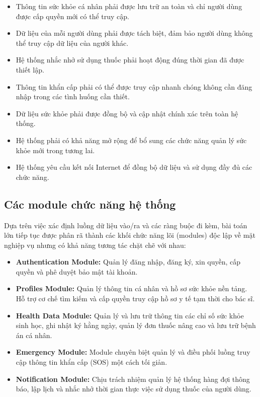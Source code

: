 \documentclass[12pt,a4paper]{report}
\begin{document}
\begin{itemize}[leftmargin=1.5em, itemsep=2pt]
    \item Thông tin sức khỏe cá nhân phải được lưu trữ an toàn và chỉ người dùng được cấp quyền mới có thể truy cập.
    \item Dữ liệu của mỗi người dùng phải được tách biệt, đảm bảo người dùng không thể truy cập dữ liệu của người khác.
    \item Hệ thống nhắc nhở sử dụng thuốc phải hoạt động đúng thời gian đã được thiết lập.
    \item Thông tin khẩn cấp phải có thể được truy cập nhanh chóng không cần đăng nhập trong các tình huống cần thiết.
    \item Dữ liệu sức khỏe phải được đồng bộ và cập nhật chính xác trên toàn hệ thống.
    \item Hệ thống phải có khả năng mở rộng để bổ sung các chức năng quản lý sức khỏe mới trong tương lai.
    \item Hệ thống yêu cầu kết nối Internet để đồng bộ dữ liệu và sử dụng đầy đủ các chức năng.
\end{itemize}

\subsection{Các module chức năng hệ thống}
Dựa trên việc xác định luồng dữ liệu vào/ra và các ràng buộc đi kèm, bài toán lớn tiếp tục được phân rã thành các khối chức năng lõi (modules) độc lập về mặt nghiệp vụ nhưng có khả năng tương tác chặt chẽ với nhau:

\begin{itemize}[leftmargin=1.5em, itemsep=3pt]
    \item \textbf{Authentication Module:} Quản lý đăng nhập, đăng ký, xin quyền, cấp quyền và phê duyệt bảo mật tài khoản.
    \item \textbf{Profiles Module:} Quản lý thông tin cá nhân và hồ sơ sức khỏe nền tảng. Hỗ trợ cơ chế tìm kiếm và cấp quyền truy cập hồ sơ y tế tạm thời cho bác sĩ.
    \item \textbf{Health Data Module:} Quản lý và lưu trữ thông tin các chỉ số sức khỏe sinh học, ghi nhật ký hằng ngày, quản lý đơn thuốc nâng cao và lưu trữ bệnh án cá nhân.
    \item \textbf{Emergency Module:} Module chuyên biệt quản lý và điều phối luồng truy cập thông tin khẩn cấp (SOS) một cách tối giản.
    \item \textbf{Notification Module:} Chịu trách nhiệm quản lý hệ thống hàng đợi thông báo, lập lịch và nhắc nhở thời gian thực việc sử dụng thuốc của người dùng.
\end{itemize}
\end{document}

